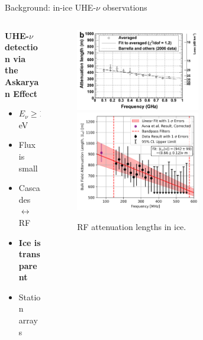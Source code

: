\documentclass{beamer}
\begin{document}
\begin{frame}{Background: in-ice UHE-$\nu$ observations}
\small
\begin{columns}[T]
\begin{column}{0.32\textwidth}
\textbf{\alert{UHE-$\nu$ detection via the Askaryan Effect}}
\begin{itemize}
\item $E_{\nu} \geq 10^{16}$ eV
\item Flux is small
\item Cascades $\leftrightarrow$ RF
\item \textbf{Ice is transparent}
\item Station arrays
\end{itemize}
\end{column}
\begin{column}{0.68\textwidth}
\begin{figure}
\centering
\includegraphics[width=0.6\textwidth]{moores_atten.png}
\includegraphics[width=0.6\textwidth]{atten_greenland.png}
\caption{\footnotesize RF attenuation lengths in ice.}
\end{figure}
\end{column}
\end{columns}
\end{frame}
\end{document}
